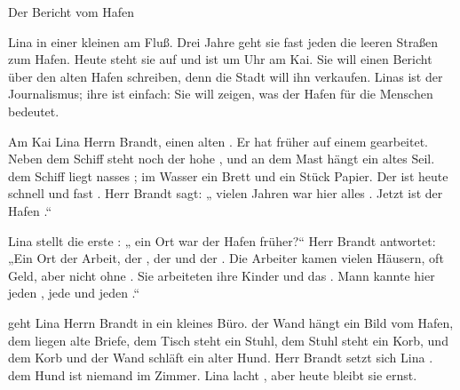 \documentclass[12pt]{nextbook}
\begin{document}
\begin{readersection}{Der Bericht vom Hafen}

Lina    in einer kleinen  am Fluß. Drei Jahre  geht sie fast jeden   die leeren Straßen zum Hafen. Heute steht sie    auf und ist um  Uhr am Kai. Sie will einen Bericht über den alten Hafen schreiben, denn die Stadt will ihn verkaufen. Linas  ist der Journalismus; ihre  ist einfach: Sie will zeigen, was der Hafen für die Menschen bedeutet.

Am Kai  Lina Herrn Brandt, einen alten . Er hat früher auf einem  gearbeitet. Neben dem Schiff steht noch der hohe , und an dem Mast hängt ein altes Seil.  dem Schiff liegt nasses ; im Wasser  ein Brett und ein Stück Papier. Der  ist heute schnell und fast . Herr Brandt sagt: „ vielen Jahren war hier alles . Jetzt ist der Hafen .“

Lina stellt die erste : „ ein Ort war der Hafen früher?“ Herr Brandt antwortet: „Ein Ort der Arbeit, der , der  und der . Die Arbeiter kamen  vielen Häusern, oft  Geld, aber nicht ohne . Sie arbeiteten  ihre Kinder und  das .  Mann kannte hier jeden , jede  und jeden .“

  geht Lina  Herrn Brandt in ein kleines Büro.  der Wand hängt ein Bild vom Hafen,  dem  liegen alte Briefe,  dem Tisch steht ein Stuhl,  dem Stuhl steht ein Korb, und  dem Korb und der Wand schläft ein alter Hund. Herr Brandt setzt sich Lina .  dem Hund ist niemand im Zimmer. Lina lacht , aber heute bleibt sie ernst.


\end{readersection}
\end{document}
